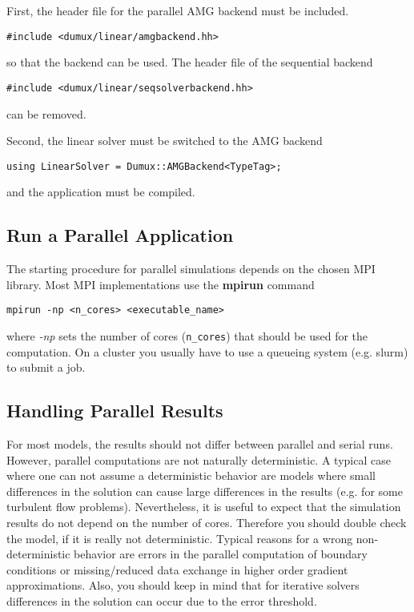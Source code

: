 First, the header file for the parallel AMG backend must be included.

\begin{lstlisting}[style=DumuxCode]
#include <dumux/linear/amgbackend.hh>
\end{lstlisting}

so that the backend can be used. The header file of the sequential backend

\begin{lstlisting}[style=DumuxCode]
#include <dumux/linear/seqsolverbackend.hh>
\end{lstlisting}
can be removed.

Second, the linear solver must be switched to the AMG backend 

\begin{lstlisting}[style=DumuxCode]
using LinearSolver = Dumux::AMGBackend<TypeTag>;
\end{lstlisting}

and the application must be compiled. 

\subsection{Run a Parallel Application}
The starting procedure for parallel simulations depends on the chosen MPI library. 
Most MPI implementations use the \textbf{mpirun} command

\begin{lstlisting}[style=Bash]
mpirun -np <n_cores> <executable_name>
\end{lstlisting}

where \textit{-np} sets the number of cores (\texttt{n\_cores}) that should be used for the 
computation. On a cluster you usually have to use a queueing system (e.g. slurm) to 
submit a job. 

\subsection{Handling Parallel Results}
For most models, the results should not differ between parallel and serial 
runs. However, parallel computations are not naturally deterministic. 
A typical case where one can not assume a deterministic behavior are models where
small differences in the solution can cause large differences in the results 
(e.g. for some turbulent flow problems). Nevertheless, it is useful to expect that
the simulation results do not depend on the number of cores. Therefore you should double check 
the model, if it is really not deterministic. Typical reasons for a wrong non-deterministic
behavior are errors in the parallel computation of boundary conditions or missing/reduced
data exchange in higher order gradient approximations. Also, you should keep in mind that 
for iterative solvers differences in the solution can occur due to the error threshold.


